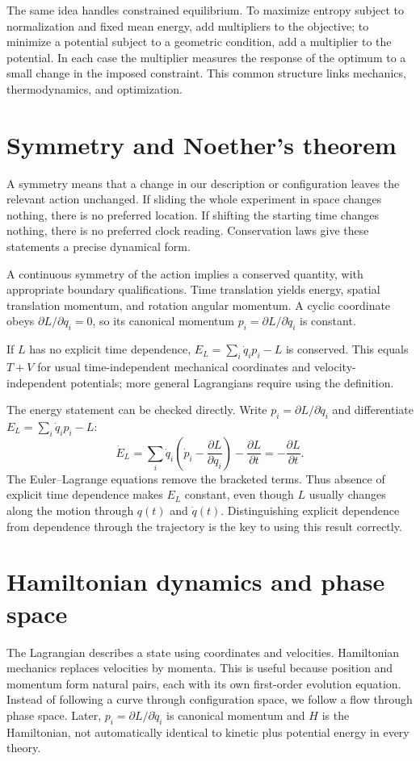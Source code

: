 \documentclass[11pt,oneside]{book}
\newcommand{\pd}[2]{\frac{\partial #1}{\partial #2}}
\theoremstyle{reviewstyle}
\begin{document}
The same idea handles constrained equilibrium. To maximize entropy subject to normalization and fixed mean energy, add multipliers to the objective; to minimize a potential subject to a geometric condition, add a multiplier to the potential. In each case the multiplier measures the response of the optimum to a small change in the imposed constraint. This common structure links mechanics, thermodynamics, and optimization.

\section{Symmetry and Noether's theorem}
A symmetry means that a change in our description or configuration leaves the relevant action unchanged. If sliding the whole experiment in space changes nothing, there is no preferred location. If shifting the starting time changes nothing, there is no preferred clock reading. Conservation laws give these statements a precise dynamical form.

A continuous symmetry of the action implies a conserved quantity, with appropriate boundary qualifications. Time translation yields energy, spatial translation momentum, and rotation angular momentum. A cyclic coordinate obeys $\partial L/\partial q_i=0$, so its canonical momentum
$p_i=\partial L/\partial\dot q_i$ is constant.

If $L$ has no explicit time dependence, $E_L=\sum_i\dot q_ip_i-L$ is conserved. This equals $T+V$ for usual time-independent mechanical coordinates and velocity-independent potentials; more general Lagrangians require using the definition.

The energy statement can be checked directly. Write $p_i=\partial L/\partial\dot q_i$ and differentiate $E_L=\sum_i\dot q_ip_i-L$:
\begin{equation}
\dot E_L=\sum_i\dot q_i\left(\dot p_i-\pd L{q_i}\right)-\pd Lt
=-\pd Lt.
\end{equation}
The Euler--Lagrange equations remove the bracketed terms. Thus absence of explicit time dependence makes $E_L$ constant, even though $L$ usually changes along the motion through $q(t)$ and $\dot q(t)$. Distinguishing explicit dependence from dependence through the trajectory is the key to using this result correctly.

\section{Hamiltonian dynamics and phase space}
The Lagrangian describes a state using coordinates and velocities. Hamiltonian mechanics replaces velocities by momenta. This is useful because position and momentum form natural pairs, each with its own first-order evolution equation. Instead of following a curve through configuration space, we follow a flow through phase space. Later, $p_i=\partial L/\partial\dot q_i$ is canonical momentum and $H$ is the Hamiltonian, not automatically identical to kinetic plus potential energy in every theory.
\end{document}
